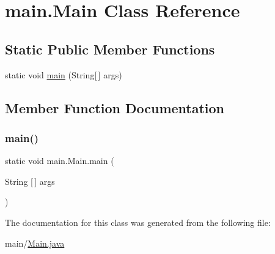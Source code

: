 \hypertarget{classmain_1_1_main}{}\section{main.\+Main Class Reference}
\label{classmain_1_1_main}
\subsection*{Static Public Member Functions}
\begin{DoxyCompactItemize}
\item 
static void \hyperlink{classmain_1_1_main_a896f71a651b705304693dbfe0cf9ca63}{main} (String\mbox{[}$\,$\mbox{]} args)
\end{DoxyCompactItemize}


\subsection{Member Function Documentation}
\mbox{\label{classmain_1_1_main_a896f71a651b705304693dbfe0cf9ca63}} 
\subsubsection{\texorpdfstring{main()}{main()}}
{\footnotesize\ttfamily static void main.\+Main.\+main (\begin{DoxyParamCaption}\item[{String \mbox{[}$\,$\mbox{]}}]{args }\end{DoxyParamCaption})\hspace{0.3cm}{\ttfamily [static]}}



The documentation for this class was generated from the following file\+:\begin{DoxyCompactItemize}
\item 
main/\hyperlink{_main_8java}{Main.\+java}\end{DoxyCompactItemize}
